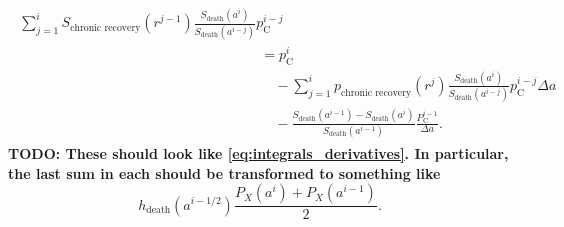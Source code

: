 \documentclass[12pt]{article}
\begin{document}
\begin{subequations}
\begin{align}
\begin{split}
      \sum_{j = 1}^i S_{\text{chronic recovery}}(r^{j - 1})
      \frac{S_{\text{death}}(a^i)}{S_{\text{death}}(a^{i - j})}
      p_{\mathrm{C}}^{i - j}
      \\
      &= p_{\mathrm{C}}^i
      \\ & \quad {}
      - \sum_{j = 1}^i p_{\text{chronic recovery}}(r^j)
      \frac{S_{\text{death}}(a^i)}{S_{\text{death}}(a^{i - j})}
      p_{\mathrm{C}}^{i - j} \Delta a
      \\ & \quad {}
      - \frac{S_{\text{death}}(a^{i - 1}) - S_{\text{death}}(a^i)}
      {S_{\text{death}}(a^{i - 1})}
      \frac{P_{\mathrm{C}}^{i - 1}}{\Delta a}.
    \end{split}
  \end{align}
\end{subequations}
%
\textbf{TODO: These should look like
  \eqref{eq:integrals_derivatives}. In particular, the last sum in
  each should be transformed to something like}
$$h_{\text{death}}(a^{i - 1 / 2})
\frac{P_X(a^i) + P_X(a^{i - 1})}{2}.$$
%
\end{document}
